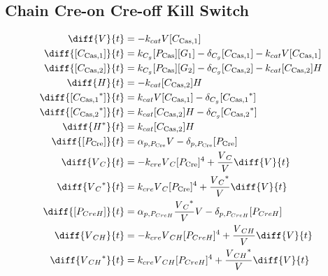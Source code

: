 \subsection{Chain Cre-on Cre-off Kill Switch}
\label{s:Chain_Cre_on_Cre_off_Kill_Switch}

\begin{align}
\diff{\vectorGen{}}{t} & = - \casCutRate{{}}\vectorGen{}\conc{\cplx{\cas}{1}}\\
\diff{\conc{\cplx{\cas}{1}}}{t} & =  \gRnaBind{}\conc{\proSp{\cas{}}}\conc{\gRna{1}} - \casCompDegradeRate{}\conc{\cplx{\cas}{1}} - \casCutRate{{}}\vectorGen{}\conc{\cplx{\cas}{1}}\\
\diff{\conc{\cplx{\cas}{2}}}{t} & =  \gRnaBind{}\conc{\proSp{\cas{}}}\conc{\gRna{2}} - \casCompDegradeRate{}\conc{\cplx{\cas}{2}} - \casCutRate{{}}\conc{\cplx{\cas}{2}}\hostGen{}\\
\diff{\hostGen{}}{t} & = - \casCutRate{{}}\conc{\cplx{\cas}{2}}\hostGen{}\\
\diff{\conc{\bound{\cplx{\cas}{1}}}}{t} & =  \casCutRate{{}}\vectorGen{}\conc{\cplx{\cas}{1}} - \casCompDegradeRate{}\conc{\bound{\cplx{\cas}{1}}}\\
\diff{\conc{\bound{\cplx{\cas}{2}}}}{t} & =  \casCutRate{{}}\conc{\cplx{\cas}{2}}\hostGen{} - \casCompDegradeRate{}\conc{\bound{\cplx{\cas}{2}}}\\
\diff{\edited{\hostGen{}}}{t} & =  \casCutRate{{}}\conc{\cplx{\cas}{2}}\hostGen{}\\
\diff{\conc{\proSp{\cre{}}}}{t} & =  \txtlRate{\proSp{\cre{}}}\vectorGen{} - \proDegradeRate{\proSp{\cre{}}}\conc{\proSp{\cre{}}}\\
\diff{\vectorGen{}_C}{t} & = - \creCutRate{} \vectorGen{}_C \conc{\proSp{\cre{}}}^4 + \frac{\vectorGen{}_C}{\vectorGen{}} \diff{\vectorGen{}}{t}\\
\diff{\edited{\vectorGen{}_C}}{t} & =  \creCutRate{} \vectorGen{}_C \conc{\proSp{\cre{}}}^4 + \frac{\edited{\vectorGen{}_C}}{\vectorGen{}} \diff{\vectorGen{}}{t}\\
\diff{\conc{\proSp{CreH}}}{t} & =  \txtlRate{\proSp{CreH}}\frac{\edited{\vectorGen{}_C}}{\vectorGen{}}\vectorGen{} - \proDegradeRate{\proSp{CreH}}\conc{\proSp{CreH}}\\
\diff{\vectorGen{}_{CH}}{t} & = - \creCutRate{} \vectorGen{}_{CH} \conc{\proSp{CreH}}^4 + \frac{\vectorGen{}_{CH}}{\vectorGen{}} \diff{\vectorGen{}}{t}\\
\diff{\edited{\vectorGen{}_{CH}}}{t} & =  \creCutRate{} \vectorGen{}_{CH} \conc{\proSp{CreH}}^4 + \frac{\edited{\vectorGen{}_{CH}}}{\vectorGen{}} \diff{\vectorGen{}}{t}\\

\end{align}
